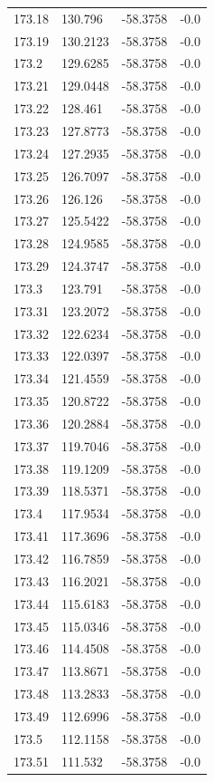 \begin{table}[H]
\begin{tabular}{llll}
173.18 & 130.796 & -58.3758 & -0.0 \\
173.19 & 130.2123 & -58.3758 & -0.0 \\
173.2 & 129.6285 & -58.3758 & -0.0 \\
173.21 & 129.0448 & -58.3758 & -0.0 \\
173.22 & 128.461 & -58.3758 & -0.0 \\
173.23 & 127.8773 & -58.3758 & -0.0 \\
173.24 & 127.2935 & -58.3758 & -0.0 \\
173.25 & 126.7097 & -58.3758 & -0.0 \\
173.26 & 126.126 & -58.3758 & -0.0 \\
173.27 & 125.5422 & -58.3758 & -0.0 \\
173.28 & 124.9585 & -58.3758 & -0.0 \\
173.29 & 124.3747 & -58.3758 & -0.0 \\
173.3 & 123.791 & -58.3758 & -0.0 \\
173.31 & 123.2072 & -58.3758 & -0.0 \\
173.32 & 122.6234 & -58.3758 & -0.0 \\
173.33 & 122.0397 & -58.3758 & -0.0 \\
173.34 & 121.4559 & -58.3758 & -0.0 \\
173.35 & 120.8722 & -58.3758 & -0.0 \\
173.36 & 120.2884 & -58.3758 & -0.0 \\
173.37 & 119.7046 & -58.3758 & -0.0 \\
173.38 & 119.1209 & -58.3758 & -0.0 \\
173.39 & 118.5371 & -58.3758 & -0.0 \\
173.4 & 117.9534 & -58.3758 & -0.0 \\
173.41 & 117.3696 & -58.3758 & -0.0 \\
173.42 & 116.7859 & -58.3758 & -0.0 \\
173.43 & 116.2021 & -58.3758 & -0.0 \\
173.44 & 115.6183 & -58.3758 & -0.0 \\
173.45 & 115.0346 & -58.3758 & -0.0 \\
173.46 & 114.4508 & -58.3758 & -0.0 \\
173.47 & 113.8671 & -58.3758 & -0.0 \\
173.48 & 113.2833 & -58.3758 & -0.0 \\
173.49 & 112.6996 & -58.3758 & -0.0 \\
173.5 & 112.1158 & -58.3758 & -0.0 \\
173.51 & 111.532 & -58.3758 & -0.0 \\

\end{tabular}
\end{table}
